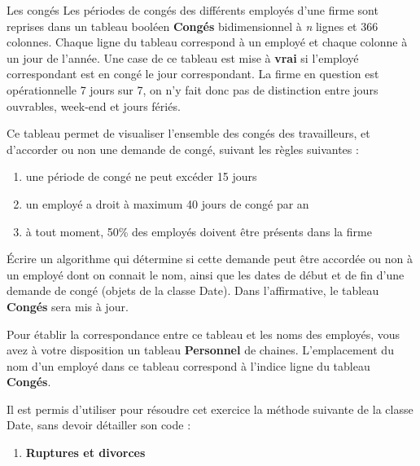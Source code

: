 \begin{Exercice}{Les congés}
	Les périodes de congés des différents employés d’une firme sont reprises
	dans un tableau booléen \textbf{Congés} bidimensionnel à \textit{n}
	lignes et 366 colonnes. Chaque ligne du tableau correspond à un employé
	et chaque colonne à un jour de l’année. Une case de ce tableau est mise
	à \textbf{vrai} si l’employé correspondant est en congé le jour
	correspondant. La firme en question est opérationnelle 7 jours sur 7,
	on n’y fait donc pas de distinction entre jours ouvrables, week-end et
	jours fériés.

	Ce tableau permet de visualiser l’ensemble des congés des travailleurs,
	et d’accorder ou non une demande de congé, suivant les règles suivantes :

	\liststyleWWviiiNumiv
	\begin{enumerate}
		\item 
			une période de congé ne peut excéder 15 jours
		\item 
			un employé a droit à maximum 40 jours de congé par an
		\item 
			à tout moment, 50\% des employés doivent être présents dans la firme
	\end{enumerate}
	
	Écrire un algorithme qui détermine si cette demande peut être accordée
	ou non à un employé dont on connait le nom, ainsi que les dates de
	début et de fin d’une demande de congé (objets de la classe Date). Dans
	l’affirmative, le tableau \textbf{Congés} sera mis à jour.

	Pour établir la correspondance entre ce tableau et les noms des
	employés, vous avez à votre disposition un tableau \textbf{Personnel}
	de chaines. L’emplacement du nom d’un employé dans ce tableau
	correspond à l’indice ligne du tableau \textbf{Congés}.

	Il est permis d’utiliser pour résoudre cet exercice la méthode suivante
	de la classe Date, sans devoir détailler son code :
	
\end{Exercice}

\bigskip

\liststyleExercice
\begin{enumerate}
\item {\sffamily\bfseries
Ruptures et divorces}
\end{enumerate}

